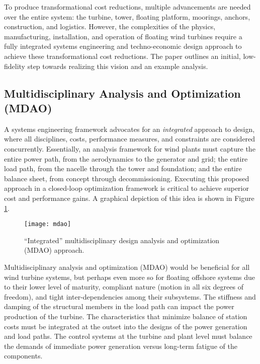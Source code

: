 To produce transformational cost reductions, multiple advancements are
needed over the entire system: the turbine, tower, floating platform,
moorings, anchors, construction, and logistics.  However, the
complexities of the physics, manufacturing, installation, and operation
of floating wind turbines require a fully integrated systems engineering
and techno-economic design approach to achieve these transformational
cost reductions.   The paper outlines an initial, low-fidelity
step towards realizing this vision and an example analysis.

\subsection{Multidisciplinary Analysis and Optimization (MDAO)}
A systems engineering framework advocates for an
\textit{integrated} approach to design, where all disciplines, costs,
performance measures, and constraints are considered concurrently.
Essentially, an analysis framework for wind plants must capture the
entire power path, from the aerodynamics to the generator and grid; the
entire load path, from the nacelle through the tower and foundation; and
the entire balance sheet, from concept through decommissioning.
Executing this proposed approach in a closed-loop optimization framework
is critical to achieve superior cost and performance gains.
A graphical depiction of this idea is shown in Figure
\ref{fig:mdao}.

\begin{figure}[htbp]
  \begin{center}
    \texttt{[image: mdao]}
  \caption{``Integrated'' multidisciplinary design analysis and optimization
    (MDAO) approach.}
  \label{fig:mdao}
  \end{center}
\end{figure}

Multidisciplinary analysis and optimization (MDAO) would be beneficial
for all wind turbine systems, but perhaps even more so for floating
offshore systems due to their lower level of maturity, compliant nature
(motion in all six degrees of freedom), and tight inter-dependencies
among their subsystems. The stiffness and damping of the structural
members in the load path can impact the power production of the
turbine. The characteristics that minimize balance of station costs must
be integrated at the outset into the designs of the power generation and
load paths. The control systems at the turbine and plant level must
balance the demands of immediate power generation versus long-term
fatigue of the components.

